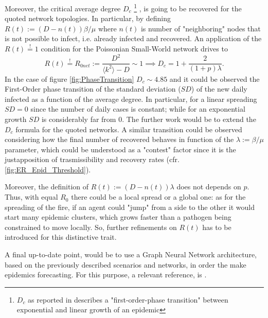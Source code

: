 \documentclass[11pt, a4paper, twoside]{article}
\begin{document}
Moreover, the critical average degree $D_c$ \footnote{$D_c$ as reported in \cite{Thurner::NetBasedExpl} describes a "first-order-phase transition" between exponential and linear growth of an epidemic} , is going to be recovered for the quoted network topologies. 
In particular, by defining $R(t):=(D-n(t))\beta / \mu$ where $n(t)$ is number of "neighboring" nodes that is not possible to infect, i.e. already infected and recovered.
An application of the $R(t) \stackrel{!}{=} 1$ condition for the Poissonian Small-World network drives to \cite{Thurner::NetBasedExpl}
\begin{equation}
	R(t) \stackrel{!}{=} R_{0net} := \frac{D^{2}}{\langle k^2 \rangle - D} \sim 1 \implies D_c = 1 + \frac{2}{(1+p)\lambda}.
\end{equation}
In the case of figure \autoref{fig:PhaseTransition} $D_c \sim 4.85$ and it could be observed the First-Order phase transition of the standard deviation ($SD$) of the new daily infected as a function of the average degree. In particular, for a linear spreading $SD = 0$ since the number of daily cases is constant; while for an exponential growth $SD$ is considerably far from $0$.
The further work would be to extend the $D_c$ formula for the quoted networks. A similar transition could be observed considering how the final number of recovered behaves in function of the $\lambda:= \beta/\mu$ parameter, which could be understood as a "contest" factor since it is the justapposition of trasmissibility and recovery rates (cfr. \autoref{fig:ER_Epid_Threshold}).

Moreover, the definition of $R(t):=(D-n(t))\lambda$ does not depends on $p$. Thus, with equal $R_0$ there could be a local spread or a global one: as for the spreading of the fire, if an agent could "jump" from a side to the other it would start many epidemic clusters, which grows faster than a pathogen being constrained to move locally. So, further refinements on $R(t)$ has to be introduced for this distinctive trait.

A final up-to-date point, would be to use a Graph Neural Network architecture, based on the previously described scenarios and networks, in order the make epidemics forecasting. For this purpose, a relevant reference, is \cite{Davahli::USA_predicting_Covid19}.


\newpage
\end{document}
